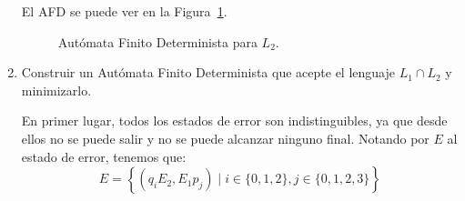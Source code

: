\documentclass[12pt]{article}
\begin{document}
\begin{ejercicio}
\begin{enumerate}
            El AFD se puede ver en la Figura~\ref{fig:afd2}.
            \begin{figure}
                \centering
                \caption{Autómata Finito Determinista para $L_2$.}
                \label{fig:afd2}
            \end{figure}
        \item Construir un Autómata Finito Determinista que acepte el lenguaje $L_1\cap L_2$ y minimizarlo.
        
        En primer lugar, todos los estados de error son indistinguibles, ya que desde ellos no se puede salir y no se puede alcanzar ninguno final. Notando por $E$ al estado de error, tenemos que:
        \begin{equation*}
            E = \left\{(q_iE_2,E_1p_j) \mid i\in \{0,1,2\}, j\in \{0,1,2,3\}\right\}
        \end{equation*}


\end{enumerate}
\end{ejercicio}
\end{document}
